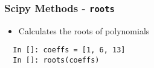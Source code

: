 \documentclass[14pt,compress]{beamer}
\newcommand{\typ}[1]{\lstinline{#1}}
\begin{document}





\begin{frame}[fragile]
\frametitle{Scipy Methods - \typ{roots}}
\begin{itemize}
\item Calculates the roots of polynomials
\end{itemize}
\begin{lstlisting}
  In []: coeffs = [1, 6, 13]
  In []: roots(coeffs)
\end{lstlisting}
\end{frame}
\end{document}
